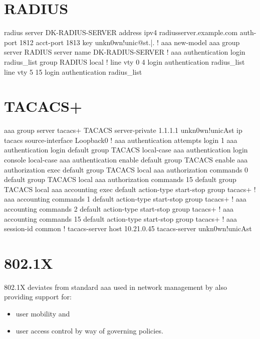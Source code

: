 \newpage

\section{RADIUS}


\begin{cisco}
radius server DK-RADIUS-SERVER
 address ipv4 radiusserver.example.com auth-port 1812 acct-port 1813
 key unkn0wn!unic@st.|.
!
aaa new-model
aaa group server RADIUS
 server name DK-RADIUS-SERVER
!
aaa authentication login radius_list group RADIUS local
!
line vty 0 4
 login authentication radius_list
line vty 5 15
 login authentication radius_list
\end{cisco}

\newpage

\section{TACACS+}


\begin{cisco}
aaa group server tacacs+ TACACS
 server-private 1.1.1.1 unkn0wn!unicAst
 ip tacacs source-interface Loopback0
!
aaa authentication attempts login 1
aaa authentication login default group TACACS local-case
aaa authentication login console local-case
aaa authentication enable default group TACACS enable
aaa authorization exec default group TACACS local 
aaa authorization commands 0 default group TACACS local 
aaa authorization commands 15 default group TACACS local 
aaa accounting exec default
 action-type start-stop
 group tacacs+
!
aaa accounting commands 1 default
 action-type start-stop
 group tacacs+
!
aaa accounting commands 2 default
 action-type start-stop
 group tacacs+
!
aaa accounting commands 15 default
 action-type start-stop
 group tacacs+
!
aaa session-id common
!
tacacs-server host 10.21.0.45
tacacs-server unkn0wn!unicAst
\end{cisco}

\section{802.1X}

802.1X deviates from standard \gls{aaa} used in network management by also providing support for:
\begin{itemize}
	\item user mobility and
	\item user access control by way of governing policies.
\end{itemize}

